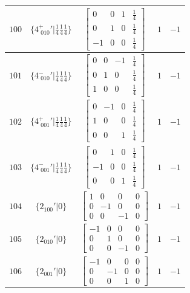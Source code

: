 \documentclass[fleqn,8pt]{jsarticle}
\begin{document}
\begin{longtable}{ccccc}
$ 100 $ & $ \{4^{+}_{\,\,010}{}'|\frac{1}{4} \frac{1}{4} \frac{1}{4}\} $ & $ \begin{bmatrix} 0 & 0 & 1 & \frac{1}{4} \\ 0 & 1 & 0 & \frac{1}{4} \\ -1 & 0 & 0 & \frac{1}{4} \end{bmatrix} $ & $ 1 $ & $ -1 $ \\ \hline
$ 101 $ & $ \{4^{-}_{\,\,010}{}'|\frac{1}{4} \frac{1}{4} \frac{1}{4}\} $ & $ \begin{bmatrix} 0 & 0 & -1 & \frac{1}{4} \\ 0 & 1 & 0 & \frac{1}{4} \\ 1 & 0 & 0 & \frac{1}{4} \end{bmatrix} $ & $ 1 $ & $ -1 $ \\ \hline
$ 102 $ & $ \{4^{+}_{\,\,001}{}'|\frac{1}{4} \frac{1}{4} \frac{1}{4}\} $ & $ \begin{bmatrix} 0 & -1 & 0 & \frac{1}{4} \\ 1 & 0 & 0 & \frac{1}{4} \\ 0 & 0 & 1 & \frac{1}{4} \end{bmatrix} $ & $ 1 $ & $ -1 $ \\ \hline
$ 103 $ & $ \{4^{-}_{\,\,001}{}'|\frac{1}{4} \frac{1}{4} \frac{1}{4}\} $ & $ \begin{bmatrix} 0 & 1 & 0 & \frac{1}{4} \\ -1 & 0 & 0 & \frac{1}{4} \\ 0 & 0 & 1 & \frac{1}{4} \end{bmatrix} $ & $ 1 $ & $ -1 $ \\ \hline
$ 104 $ & $ \{2{}_{100}{}'|0\} $ & $ \begin{bmatrix} 1 & 0 & 0 & 0 \\ 0 & -1 & 0 & 0 \\ 0 & 0 & -1 & 0 \end{bmatrix} $ & $ 1 $ & $ -1 $ \\ \hline
$ 105 $ & $ \{2{}_{010}{}'|0\} $ & $ \begin{bmatrix} -1 & 0 & 0 & 0 \\ 0 & 1 & 0 & 0 \\ 0 & 0 & -1 & 0 \end{bmatrix} $ & $ 1 $ & $ -1 $ \\ \hline
$ 106 $ & $ \{2{}_{001}{}'|0\} $ & $ \begin{bmatrix} -1 & 0 & 0 & 0 \\ 0 & -1 & 0 & 0 \\ 0 & 0 & 1 & 0 \end{bmatrix} $ & $ 1 $ & $ -1 $ \\ \hline

\end{longtable}
\end{document}
